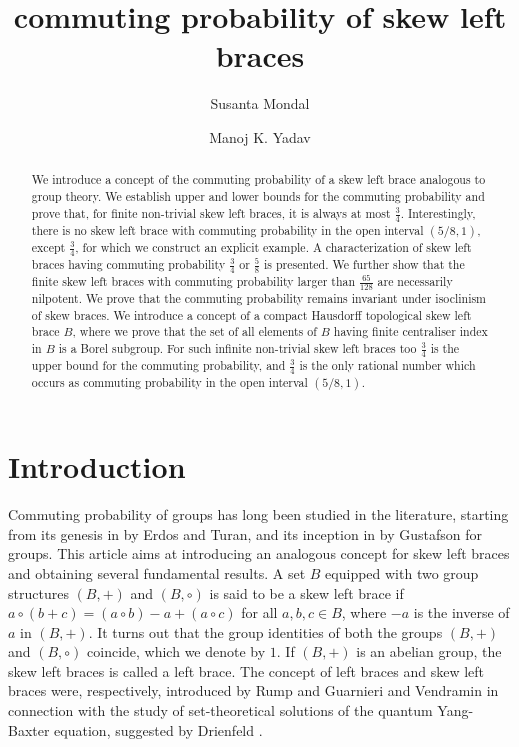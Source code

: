 \documentclass[oneside]{amsart}
\author{Susanta Mondal}
\author{Manoj K. Yadav}
\numberwithin{equation}{section}
\theoremstyle{plain}
\theoremstyle{definition}
\begin{document}
\setcounter{page}{1}
\title[commuting probability of skew  left braces]
{commuting probability of  skew  left  braces}

\maketitle



\begin{abstract}
We introduce a concept of the commuting probability of a skew left brace analogous to group theory.
We establish upper and lower bounds for the commuting probability and prove that, for finite non-trivial skew left braces, it is always  at most $\frac{3}{4}$. Interestingly, there is no  skew left brace with commuting probability in the open  interval $(5/8, 1)$, except  $\frac{3}{4}$, for which we construct an explicit example. A characterization of skew left braces having commuting probability $\frac{3}{4}$ or $\frac{5}{8}$ is presented. We further show that the finite skew left braces  with commuting probability  larger than $\frac{65}{128}$ are necessarily nilpotent. We prove that the commuting probability remains invariant under isoclinism of skew braces.  We introduce a concept of a compact Hausdorff topological skew left brace $B$, where we prove that the set of all elements of $B$ having finite centraliser index in $B$ is a Borel subgroup. For such  infinite non-trivial  skew left braces too $\frac{3}{4}$ is the upper bound for the commuting probability, and $\frac{3}{4}$ is the only rational number which occurs as commuting probability in the open interval $(5/8, 1)$.
\end{abstract}





\section{Introduction}

Commuting probability of groups has long been studied in the literature, starting from its genesis in \cite{ET68} by Erdos and Turan, and its inception in \cite{WHG73} by Gustafson  for groups.  This article aims at introducing an analogous concept for skew left braces and obtaining several fundamental results. A set $B$ equipped with two group structures $(B, +)$ and $(B, \circ)$ is said to be a skew left brace if $a \circ (b + c) = (a \circ b) - a + (a \circ c)$  for all $a, b, c \in B$, where $-a$ is the inverse of $a$ in $(B, +)$. It turns out that the group identities of both the groups $(B, +)$ and $(B, \circ)$ coincide, which we denote by $1$.  If $(B, +)$ is an abelian group, the skew left braces is called a left brace.
The concept of left braces and skew left braces were, respectively, introduced by Rump \cite{Rump07} and Guarnieri and Vendramin \cite{GV17} in connection with the study of set-theoretical solutions of the quantum Yang-Baxter equation, suggested by Drienfeld  \cite{Drinfeld92}.
\end{document}
